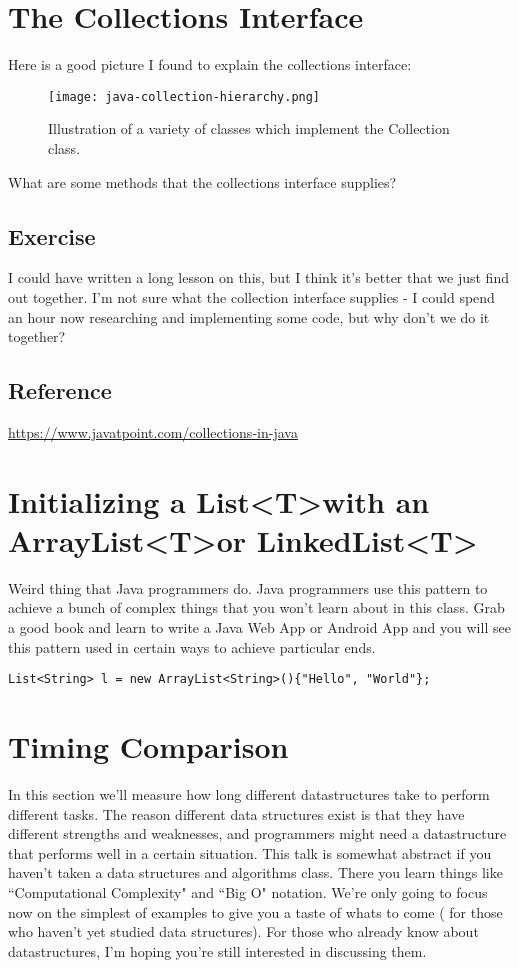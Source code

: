 \documentclass[12pt]{article}
\begin{document}
\section{The Collections Interface}
Here is a good picture I found to explain the collections interface:

\begin{figure}[h]
  \centering
    \texttt{[image: java-collection-hierarchy.png]}
  \caption{Illustration of a variety of classes which implement the Collection class.}
\end{figure}


What are some methods that the  collections interface supplies?

\subsection{Exercise}
I could have written a long lesson on this, but I think it's better that we just find out together. I'm not sure what the collection interface supplies - I could spend an hour now researching and implementing some code, but why don't we do it together?

\subsection{Reference}

\url{https://www.javatpoint.com/collections-in-java}

\section{Initializing a List\textless T\textgreater with an ArrayList\textless T\textgreater or LinkedList\textless T\textgreater}
Weird thing that Java programmers do. Java programmers use this pattern to achieve a bunch of complex things that you won't learn about in this class. Grab a good book and learn to write a Java Web App or Android App and you will see this pattern used in certain ways to achieve particular ends.

\begin{lstlisting}
List<String> l = new ArrayList<String>(){"Hello", "World"};
\end{lstlisting}

\section{Timing Comparison}
In this section we'll measure how long different datastructures take to perform different tasks. The reason different data structures exist is that they have different strengths and weaknesses, and programmers might need a datastructure that performs well in a certain situation. This talk is somewhat abstract if you haven't taken  a data structures and algorithms class. There you learn things like ``Computational Complexity" and ``Big O" notation. We're only going to focus now on the simplest of examples to give you a taste of whats to come ( for those who haven't yet studied data structures). For those who already know about datastructures, I'm hoping you're still interested in discussing them.
\end{document}
